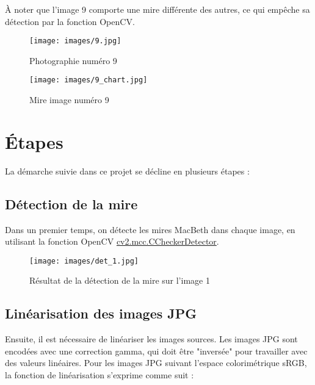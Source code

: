 \documentclass[12pt]{article}
\begin{document}
À noter que l'image 9 comporte une mire différente des autres, ce qui empêche sa détection par la fonction OpenCV.

\begin{figure}[H]
    \centering
    \begin{minipage}{0.48\textwidth}
        \centering
        \texttt{[image: images/9.jpg]}
        \caption{Photographie numéro 9}
    \end{minipage}
    \hfill
    \begin{minipage}{0.48\textwidth}
        \centering
        \texttt{[image: images/9\_chart.jpg]}
        \caption{Mire image numéro 9}
    \end{minipage}
\end{figure}

\clearpage

\section{Étapes}

La démarche suivie dans ce projet se décline en plusieurs étapes :

\subsection{Détection de la mire}

Dans un premier temps, on détecte les mires MacBeth dans chaque image, en utilisant la fonction OpenCV \href{https://docs.opencv.org/4.x/dd/d19/group__mcc.html\#gga836ee96afcefd4f35e95760ca9e8163da3c0b5a40e1157d57f944cab818e7311d}{cv2.mcc.CCheckerDetector}.

\begin{figure}[H]
    \centering
    \texttt{[image: images/det\_1.jpg]}
    \caption{Résultat de la détection de la mire sur l'image 1}
\end{figure}

\subsection{Linéarisation des images JPG}

Ensuite, il est nécessaire de linéariser les images sources. Les images JPG sont encodées avec une correction gamma, qui doit être "inversée" pour travailler avec des valeurs linéaires. Pour les images JPG suivant l'espace colorimétrique sRGB, la fonction de linéarisation s'exprime comme suit :
\end{document}
